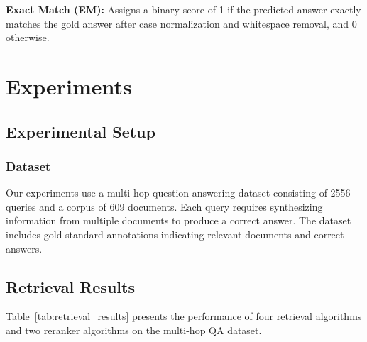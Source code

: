 \documentclass[10pt,twocolumn]{article}
\begin{document}
\textbf{Exact Match (EM):} Assigns a binary score of 1 if the predicted answer exactly matches the gold answer after case normalization and whitespace removal, and 0 otherwise.

\section{Experiments}

\subsection{Experimental Setup}

\subsubsection{Dataset}
Our experiments use a multi-hop question answering dataset consisting of 2556 queries and a corpus of 609 documents. Each query requires synthesizing information from multiple documents to produce a correct answer. The dataset includes gold-standard annotations indicating relevant documents and correct answers.


\subsection{Retrieval Results}

Table~\ref{tab:retrieval_results} presents the performance of four retrieval algorithms and two reranker algorithms on the multi-hop QA dataset.
\end{document}
